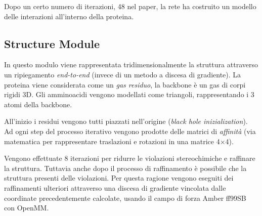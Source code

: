 Dopo un certo numero di iterazioni, 48 nel paper, la rete ha costruito un modello delle interazioni all'interno della proteina. 


\subsection{Structure Module}

In questo modulo viene rappresentata tridimensionalmente la struttura attraverso un ripiegamento \textit{end-to-end} (invece di un metodo a discesa di gradiente). La proteina viene considerata come un \textit{gas residuo}, la backbone è un gas di corpi rigidi 3D. Gli amminoacidi vengono modellati come triangoli, rappresentando i 3 atomi della backbone. 

\par All'inizio i residui vengono tutti piazzati nell'origine (\textit{black hole inizialization}). Ad ogni step del processo iterativo vengono prodotte delle matrici di \textit{affinità} (via matematica per rappresentare traslazioni e rotazioni in una matrice 4×4).

\par Vengono effettuate 8 iterazioni per ridurre le violazioni stereochimiche e raffinare la struttura. Tuttavia anche dopo il processo di raffinamento è possibile che la struttura presenti delle violazioni. Per questa ragione vengono eseguiti dei raffinamenti ulteriori attraverso una discesa di gradiente vincolata dalle coordinate precedentemente calcolate, usando il campo di forza Amber ff99SB con OpenMM.

